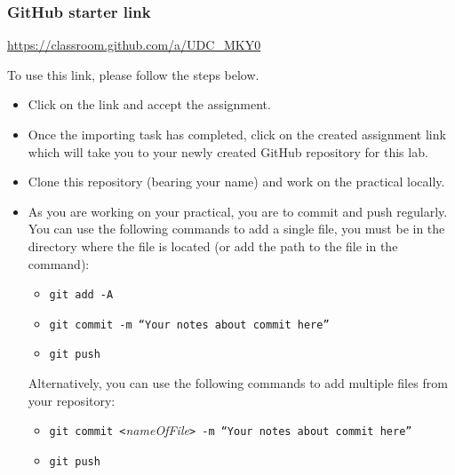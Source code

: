 

\long{}







\subsubsection*{GitHub starter link}
\begin{center}
\color{red} \url{https://classroom.github.com/a/UDC_MKY0} \color{black}
\end{center}



To use this link, please follow the steps below.
\begin{itemize}
	\item Click on the link and accept the assignment.
	\item Once the importing task has completed, click on the created assignment link which will take you to your newly created GitHub repository for this lab.
	\item Clone this repository (bearing your name) and work on the practical locally.
	\item As you are working on your practical, you are to commit and push regularly. You can use the following commands to add a single file, you must be in the directory where the file is located (or add the path to the file in the command):
		\begin{itemize}
		\item {\tt git add -A}
		\item {\tt git commit -m ``Your notes about commit here''}
		\item {\tt git push}
	\end{itemize}

	Alternatively, you can use the following commands to add multiple files from your repository:
	\begin{itemize}
		\item {\tt git commit <}\emph{nameOfFile}\tt{> -m ``Your notes about commit here''}
		\item {\tt git push}
	\end{itemize}
\end{itemize}



